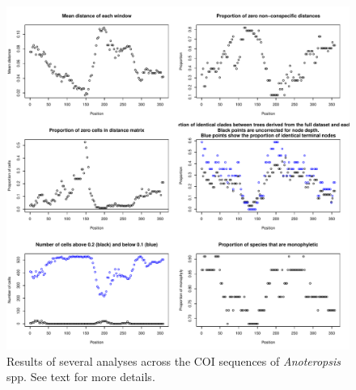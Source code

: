 \documentclass{article}
\begin{document}
\begin{figure}[tbp]
	\includegraphics[width=\textwidth]{slideAnalyses}
	\caption{Results of several analyses across the COI sequences of \emph{Anoteropsis} spp. See text for more details.}%
	\label{slideAnalyses.fig}
\end{figure}
\end{document}

